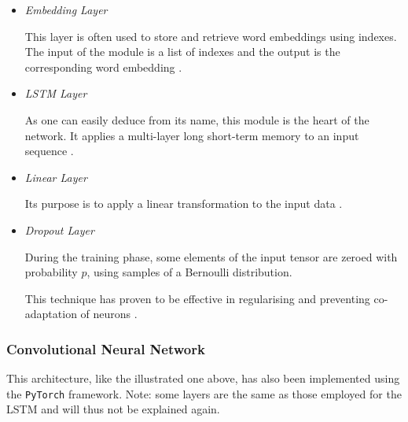 \documentclass[letterpaper,11pt]{article}
\begin{document}
\begin{itemize}
  \item \textit{Embedding Layer}
  
  \vspace{-0.6mm}
  
  This layer is often used to store and retrieve word embeddings using indexes. The input of the module is a list of indexes and the output is the corresponding word embedding \cite{pytorch_embedding}.
  \item \textit{LSTM Layer}
  
  \vspace{-0.6mm}

  As one can easily deduce from its name, this module is the heart of the network. It applies a multi-layer long short-term memory to an input sequence \cite{pytorch_lstm}.
  \item \textit{Linear Layer}
  
  \vspace{-0.6mm}
  
  Its purpose is to apply a linear transformation to the input data \cite{pytorch_linear}.
  \item \textit{Dropout Layer}
  
  During the training phase, some elements of the input tensor are zeroed with probability $p$, using samples of a Bernoulli distribution.

  This technique has proven to be effective in regularising and preventing co-adaptation of neurons \cite{pytorch_dropout}.
\end{itemize}



\subsubsection*{Convolutional Neural Network}

This architecture, like the illustrated one above, has also been implemented using the \verb|PyTorch| framework. Note: some layers are the same as those employed for the LSTM and will thus not be explained again.
\end{document}
